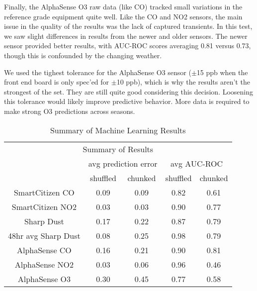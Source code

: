 Finally, the AlphaSense O3 raw data (like CO) tracked small variations in the reference grade equipment quite well.  Like the CO and NO2 sensors, the main issue in the quality of the results was the lack of captured transients.  In this test, we saw slight differences in results from the newer and older sensors.  The newer sensor provided better results, with AUC-ROC scores averaging 0.81 versus 0.73, though this is confounded by the changing weather.

We used the tighest tolerance for the AlphaSense O3 sensor ($\pm$15 ppb when the front end board is only spec'ed for $\pm$10 ppb), which is why the results aren't the strongest of the set.  They are still quite good considering this decision.  Loosening this tolerance would likely improve predictive behavior.  More data is required to make strong O3 predictions across seasons.

\begin{table}[]
\centering
\begin{tabular}{|c|c|c|c|c|}
\toprule
\multicolumn{5}{|c|}{Summary of Results} \\
&\multicolumn{2}{|c|}{avg prediction error} & \multicolumn{2}{|c|}{avg AUC-ROC} \\
&shuffled & chunked & shuffled & chunked \\
SmartCitizen CO & 0.09 & 0.09 & 0.82 & 0.61  \\
SmartCitizen NO2 & 0.03 & 0.03 & 0.90 & 0.77 \\
Sharp Dust & 0.17 & 0.22 & 0.87 & 0.79 \\
48hr avg Sharp Dust & 0.08 & 0.25 & 0.98 & 0.79 \\
AlphaSense CO & 0.16 & 0.21 & 0.90 & 0.81  \\
AlphaSense NO2 & 0.03 & 0.06 & 0.96 & 0.46 \\
AlphaSense O3 & 0.30 & 0.45 & 0.77 & 0.58 \\

\bottomrule
\end{tabular}
\label{tab:ml_summary}
\caption{Summary of Machine Learning Results}
\end{table}



%

